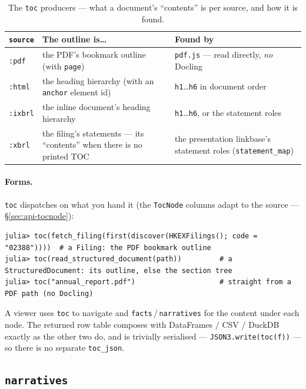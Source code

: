 \documentclass[11pt,a4paper]{report}
\begin{document}
\begin{table}[h]
\centering
\small
\caption{The \texttt{toc} producers --- what a document's ``contents'' is per source, and how it is found.}
\label{tab:toc-producers}
\begin{tabular}{@{}p{}p{}p{}@{}}
\toprule
\textbf{\texttt{source}} & \textbf{The outline is\ldots} & \textbf{Found by} \\
\midrule
\texttt{:pdf} & the PDF's bookmark outline (with \texttt{page}) & \texttt{pdf.js} --- read directly, \emph{no}
  Docling \\
\texttt{:html} & the heading hierarchy (with an \texttt{anchor} element id) & \texttt{h1}\ldots\texttt{h6} in
  document order \\
\texttt{:ixbrl} & the inline document's heading hierarchy & \texttt{h1}\ldots\texttt{h6}, or the statement roles \\
\texttt{:xbrl} & the filing's statements --- its ``contents'' when there is no printed TOC & the presentation
  linkbase's statement roles (\texttt{statement\_map}) \\
\bottomrule
\end{tabular}
\end{table}

\paragraph{Forms.} \texttt{toc} dispatches on what you hand it (the \texttt{TocNode} columns adapt to the
source --- \S\ref{sec:api-tocnode}):
\begin{lstlisting}
julia> toc(fetch_filing(first(discover(HKEXFilings(); code = "02388"))))  # a Filing: the PDF bookmark outline
julia> toc(read_structured_document(path))         # a StructuredDocument: its outline, else the section tree
julia> toc("annual_report.pdf")                    # straight from a PDF path (no Docling)
\end{lstlisting}

\noindent A viewer uses \texttt{toc} to navigate and \texttt{facts}\,/\,\texttt{narratives} for the content
under each node. The returned row table composes with DataFrames / CSV / DuckDB exactly as the other two do,
and is trivially serialised --- \texttt{JSON3.write(toc(f))} --- so there is no separate \texttt{toc\_json}.

\subsection{\texttt{narratives}}
\end{document}
